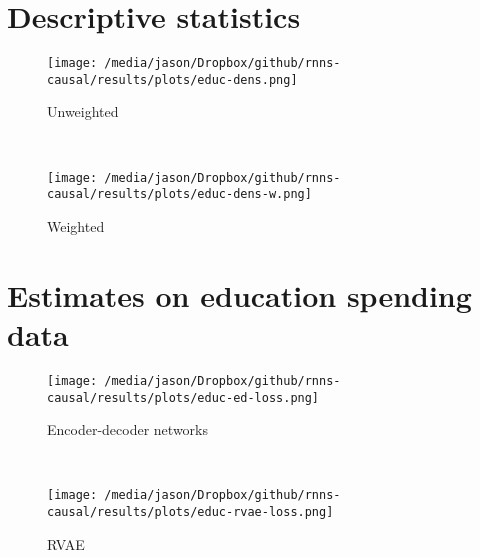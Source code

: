 \documentclass[12pt]{article}
\begin{document}
\begin{singlespacing}
\maketitle \thispagestyle{empty}
\tableofcontents \thispagestyle{empty}
\end{singlespacing}


\pagebreak
{}%

\section{Descriptive statistics}


\begin{figure*}[htbp]
	\centering
	\begin{subfigure}[t]{0.45\textwidth}
		\centering
		\texttt{[image: /media/jason/Dropbox/github/rnns-causal/results/plots/educ-dens.png]}
		\caption{Unweighted \label{educ-dense}} 
	\end{subfigure}
	~ 
	\begin{subfigure}[t]{0.45\textwidth}
		\centering
		\texttt{[image: /media/jason/Dropbox/github/rnns-causal/results/plots/educ-dens-w.png]}
		\caption{Weighted\label{educ-dense-w}}
	\end{subfigure}
	\caption{Pre-period densities of log per-capita state government education spending by treatment status. Density in \ref{educ-dense-w} weighted by propensity score.} 
\end{figure*}


\section{Estimates on education spending data}

\begin{figure*}[htbp]
	\centering
	\begin{subfigure}[t]{0.8\textwidth}
		\centering
		\texttt{[image: /media/jason/Dropbox/github/rnns-causal/results/plots/educ-ed-loss.png]}
		\caption{Encoder-decoder networks} 
	\end{subfigure}
	~ 
	\begin{subfigure}[t]{0.8\textwidth}
		\centering
		\texttt{[image: /media/jason/Dropbox/github/rnns-causal/results/plots/educ-rvae-loss.png]}
		\caption{RVAE}
	\end{subfigure}
	\caption{RNNs training and validation loss on education spending data. \label{educ-loss}} 
\end{figure*}
\end{document}
